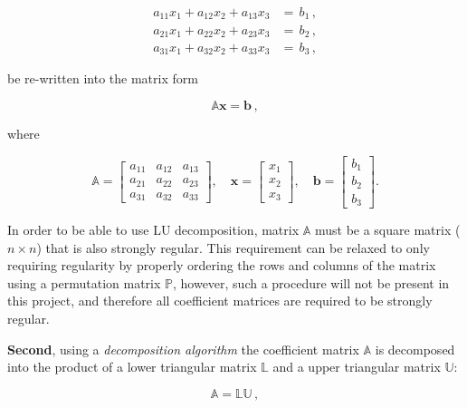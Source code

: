 \begin{align}
	a_{11}x_1 + a_{12}x_2 + a_{13}x_{3}&= \,b_1 \nonumber\,, \\ 
	a_{21}x_1 + a_{22}x_2 + a_{23}x_{3}&= \,b_2 \label{Equation:LU-decomposition-system-linear-equations}\,, \\
	a_{31}x_1 + a_{32}x_2 + a_{33}x_{3}&= \,b_3 \nonumber\,,
\end{align}

be re-written into the matrix form

\begin{equation}\label{Equation:LU-decomposition-system-linear-equations-matrix-form-Axb}
	\mathbb{A}\textbf{x} = \textbf{b}\,,
\end{equation}

where

\begin{equation}
	\mathbb{A} = 
	\begin{bmatrix}
		a_{11} & a_{12} & a_{13} \\
		a_{21} & a_{22} & a_{23} \\
		a_{31} & a_{32} & a_{33}
	\end{bmatrix}
	,\quad
	\mathbf{x} = 
	\begin{bmatrix}
		x_{1} \\
		x_{2} \\
		x_{3}
	\end{bmatrix}
	,\quad
	\mathbf{b} = 
	\begin{bmatrix}
		b_{1} \\
		b_{2} \\
		b_{3}
	\end{bmatrix}.
\end{equation}

In order to be able to use LU decomposition, matrix $ \mathbb{A} $ must be a square matrix ($ n\times n $) that is also strongly regular. This requirement can be relaxed to only requiring regularity by properly ordering the rows and columns of the matrix using a permutation matrix $ \mathbb{P} $, however, such a procedure will not be present in this project, and therefore all coefficient matrices are required to be strongly regular.
\par \textbf{Second}, using a \textit{decomposition algorithm} the coefficient matrix $ \mathbb{A} $ is decomposed into the product of a lower triangular matrix $ \mathbb{L} $ and a upper triangular matrix $ \mathbb{U} $:

\begin{equation}
	\mathbb{A} = \mathbb{LU}\,,
\end{equation}

